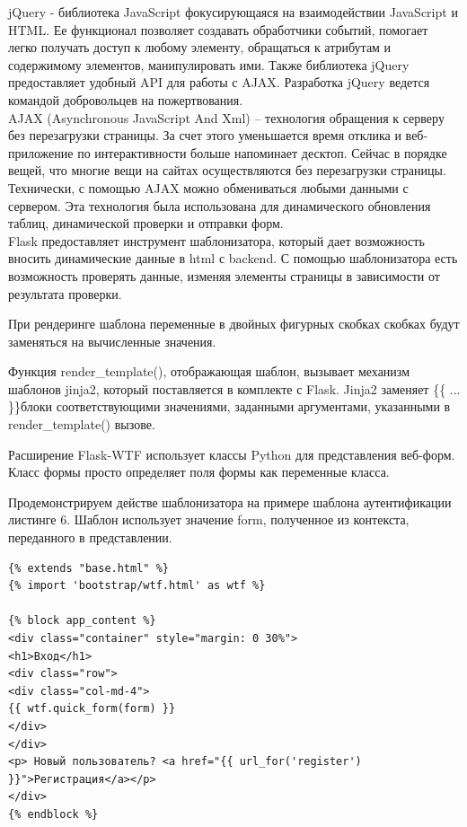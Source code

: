 \documentclass[12pt]{article}
\begin{document}
jQuery - библиотека JavaScript фокусирующаяся на взаимодействии JavaScript и HTML. Ее функционал позволяет создавать обработчики событий, помогает легко получать доступ к любому элементу, обращаться к атрибутам и содержимому элементов, манипулировать ими. Также библиотека jQuery предоставляет удобный API для работы с AJAX. Разработка jQuery ведется командой добровольцев на пожертвования. \cite{4} \\

AJAX (Asynchronous JavaScript And Xml) – технология обращения к серверу без перезагрузки страницы. За счет этого уменьшается время отклика и веб-приложение по интерактивности больше напоминает десктоп. Сейчас в порядке вещей, что многие вещи на сайтах осуществляются без перезагрузки страницы. Технически, с помощью AJAX можно обмениваться любыми данными с сервером. Эта технология была использована для динамического обновления таблиц, динамической проверки и отправки форм.  \cite{5} \\

Flask предоставляет инструмент шаблонизатора, который дает возможность вносить динамические данные в html с backend. С помощью шаблонизатора есть возможность проверять данные, изменяя элементы страницы в зависимости от результата проверки.

При рендеринге шаблона переменные в двойных фигурных скобках скобках будут заменяться на вычисленные значения.

Функция render\_template(), отображающая шаблон, вызывает механизм шаблонов jinja2, который поставляется в комплекте с Flask. Jinja2 заменяет \{\{ ... \}\}блоки соответствующими значениями, заданными аргументами, указанными в render\_template() вызове. 

Расширение Flask-WTF использует классы Python для представления веб-форм. Класс формы просто определяет поля формы как переменные класса.

Продемонстрируем действе шаблонизатора на примере шаблона аутентификации листинге 6. Шаблон использует значение form, полученное из контекста, переданного в представлении. 

\begin{lstlisting}[label=some-code, caption=Шаблон login.html]
{% extends "base.html" %}
{% import 'bootstrap/wtf.html' as wtf %}

{% block app_content %}
<div class="container" style="margin: 0 30%">
<h1>Вход</h1>
<div class="row">
<div class="col-md-4">
{{ wtf.quick_form(form) }}
</div>
</div>
<p> Новый пользователь? <a href="{{ url_for('register') }}">Регистрация</a></p>
</div>
{% endblock %}
\end{lstlisting}
\end{document}
